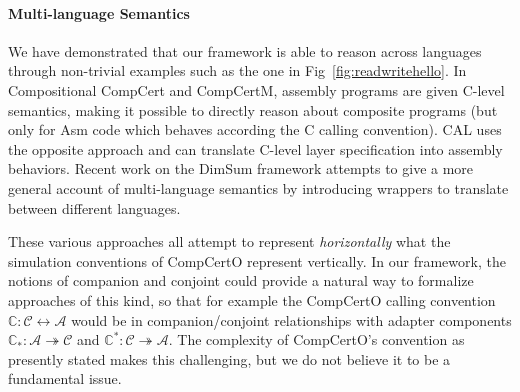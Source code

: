 \documentclass[acmsmall,nonacm]{acmart}
\begin{document}

\paragraph{Multi-language Semantics} %

We have demonstrated that our framework is able to reason across languages through non-trivial examples such as the one in Fig~\ref{fig:readwritehello}.
In Compositional CompCert and CompCertM,
assembly programs are given C-level semantics,
making it possible to directly reason about composite programs
(but only for Asm code which behaves according the C calling convention).
CAL uses the opposite approach and can translate
C-level layer specification into assembly behaviors.
Recent work on the DimSum framework \cite{dimsum}
attempts to give a more general account of
multi-language semantics
by introducing wrappers to translate between
different languages.

These various approaches all attempt
to represent \emph{horizontally} what
the simulation conventions of CompCertO represent vertically.
In our framework,
the notions of companion and conjoint
could provide a natural way to formalize
approaches of this kind,
so that for example the CompCertO calling convention
$\mathbb{C} : \mathcal{C} \leftrightarrow \mathcal{A}$
would be in companion/conjoint relationships with
adapter components
$\mathbb{C}_* : \mathcal{A} \twoheadrightarrow \mathcal{C}$
and
$\mathbb{C}^* : \mathcal{C} \twoheadrightarrow \mathcal{A}$.
The complexity of CompCertO's convention as presently stated
makes this challenging,
but we do not believe it to be a fundamental issue.
\end{document}
